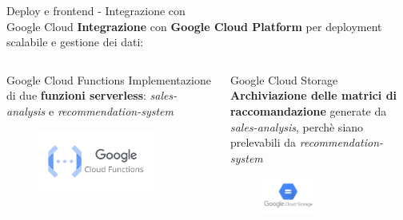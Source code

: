 \documentclass{beamer}
\begin{document}
	\begin{frame}{Deploy e frontend - Integrazione con\\ Google Cloud}
		\textbf{Integrazione} con \textbf{Google Cloud Platform} per deployment scalabile e gestione dei dati:

		\begin{columns}
			\begin{column}{0.42\textwidth}
				\begin{exampleblock}{Google Cloud Functions}
					Implementazione di due \textbf{funzioni serverless}: \textit{sales-analysis} e \textit{recommendation-system}
				\end{exampleblock}
				
				\begin{figure}
					\centering
					\includegraphics[width=0.81\textwidth]{Google-Cloud-Functions.png}
				\end{figure}
			\end{column}
			\begin{column}{0.58\textwidth}
				\begin{exampleblock}{Google Cloud Storage}
					\textbf{Archiviazione delle matrici di raccomandazione} generate da \textit{sales-analysis}, perchè siano prelevabili da \textit{recommendation-system}
				\end{exampleblock}
				
				\begin{figure}
					\centering
					\includegraphics[width=0.45\textwidth]{Google-Cloud-Storage.png}
				\end{figure}
			\end{column}
		\end{columns}
	\end{frame}
\end{document}
